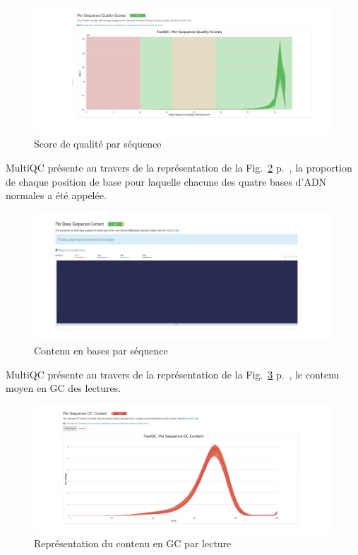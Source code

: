 \documentclass[a4paper,11pt]{article}
\begin{document}
\begin{figure}
  \begin{center}
    \includegraphics[width=16cm]{Images/MultiQC_Plots2}
  \end{center}
  \caption{Score de qualité par séquence}
  \label{fig-MultiQC_Plots2}
\end{figure}

MultiQC présente au travers de la représentation de la
Fig.~\ref{fig-MultiQC_Plots3} p.~\pageref{fig-MultiQC_Plots3}, la
proportion de chaque position de base pour laquelle chacune des quatre
bases d'ADN normales a été appelée.

\begin{figure}
  \begin{center}
    \includegraphics[width=16cm]{Images/MultiQC_Plots3}
  \end{center}
  \caption{Contenu en bases par séquence}
  \label{fig-MultiQC_Plots3}
\end{figure}

MultiQC présente au travers de la représentation de la
Fig.~\ref{fig-MultiQC_Plots4} p.~\pageref{fig-MultiQC_Plots4}, le
contenu moyen en GC des lectures.

\begin{figure}
  \begin{center}
    \includegraphics[width=16cm]{Images/MultiQC_Plots4}
  \end{center}
  \caption{Représentation du contenu en GC par lecture}
  \label{fig-MultiQC_Plots4}
\end{figure}
\end{document}
